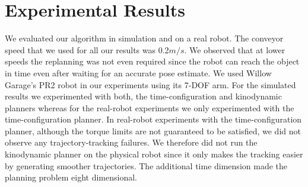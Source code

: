 \documentclass[a4paper]{report}
\begin{document}
\section{Experimental Results}
\label{sec:eval}
We evaluated our algorithm in simulation and on a real robot. The conveyor speed that we used for all our results was 0.2$m/s$.
We observed that at lower speeds the replanning was not even required since the robot can reach the object in time even after waiting for an accurate pose estimate.
We used Willow Garage's PR2 robot in our experiments using its 7-DOF arm.
For the simulated results we experimented with both, the time-configuration and kinodynamic planners whereas for the real-robot experiments we only experimented with the time-configuration planner.
In real-robot experiments with the time-configuration planner, although the torque limits are not guaranteed to be satisfied, we did not observe any trajectory-tracking failures. We therefore did not run the kinodynamic planner on the physical robot since it only makes the tracking easier by generating smoother trajectories.
%
The additional time dimension made the planning problem eight dimensional.
\end{document}
